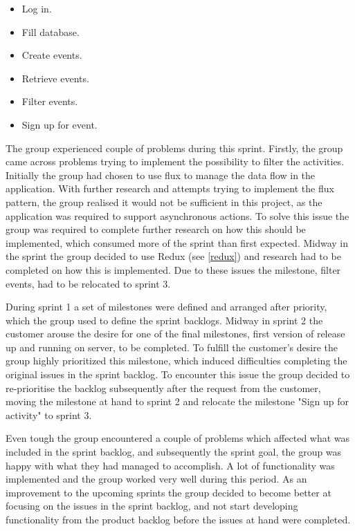 \begin{itemize}
  \item Log in.
  \item Fill database.
  \item Create events.
  \item Retrieve events.
  \item Filter events.
  \item Sign up for event.
\end{itemize}

The group experienced couple of problems during this sprint. Firstly, the group came across problems trying to implement the possibility to filter the activities. Initially the group had chosen to use flux to manage the data flow in the application. With further research and attempts trying to implement the flux pattern, the group realised it would not be sufficient in this project, as the application was required to support asynchronous actions. To solve this issue the group was required to complete further research on how this should be implemented, which consumed more of the sprint than first expected. Midway in the sprint the group decided to use Redux (see \ref{redux}) and research had to be completed on how this is implemented. Due to these issues the milestone, filter events, had to be relocated to sprint 3. 

During sprint 1 a set of milestones were defined and arranged after priority, which the group used to define the sprint backlogs. Midway in sprint 2 the customer arouse the desire for one of the final milestones, first version of release up and running on server, to be completed. To fulfill the customer's desire the group highly prioritized this milestone, which induced difficulties completing the original issues in the sprint backlog. To encounter this issue the group decided to re-prioritise the backlog subsequently after the request from the customer, moving the milestone at hand to sprint 2 and relocate the milestone "Sign up for activity" to sprint 3. 

Even tough the group encountered a couple of problems which affected what was included in the sprint backlog, and subsequently the sprint goal, the group was happy with what they had managed to accomplish. A lot of functionality was implemented and the group worked very well during this period. As an improvement to the upcoming sprints the group decided to become better at focusing on the issues in the sprint backlog, and not start developing functionality from the product backlog before the issues at hand were completed. 

